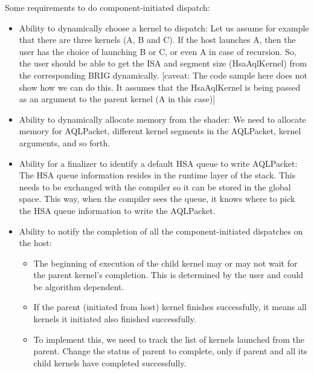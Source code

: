 \documentclass{book}
\begin{document}
\begin{appendices}
Some requirements to do component-\/initiated dispatch\-:

\begin{itemize}

\item Ability to dynamically choose a kernel to dispatch\-: Let us
assume for example that there are three kernels (A, B and C). If the
host launches A, then the user has the choice of launching B or C,
or even A in case of recursion. So, the user should be able to get
the I\-S\-A and segment size (Hsa\-Aql\-Kernel) from the
corresponding B\-R\-I\-G dynamically. \mbox{[}caveat\-: The code
sample here does not show how we can do this. It assumes that the
Hsa\-Aql\-Kernel is being passed as an argument to the parent kernel
(A in this case)\mbox{]}

\item Ability to dynamically allocate memory from the shader\-: We
need to allocate memory for A\-Q\-L\-Packet, different kernel
segments in the A\-Q\-L\-Packet, kernel arguments, and so forth.

\item Ability for a finalizer to identify a default H\-S\-A queue to
write A\-Q\-L\-Packet\-: The H\-S\-A queue information resides in
the runtime layer of the stack. This needs to be exchanged with the
compiler so it can be stored in the global space. This way, when the
compiler sees the queue, it knows where to pick the H\-S\-A queue
information to write the A\-Q\-L\-Packet.

\item Ability to notify the completion of all the
component-\/initiated dispatches on the host\-:

\begin{itemize}
\item The beginning of execution of the child kernel may or may not
wait for the parent kernel's completion. This is determined by the
user and could be algorithm dependent.
\item If the parent (initiated from host) kernel finishes
successfully, it means all kernels it initiated also finished
successfully.
\item To implement this, we need to track the list of kernels
launched from the parent. Change the status of parent to complete,
only if parent and all its child kernels have completed
successfully.
\end{itemize}
\end{itemize}


\end{appendices}
\end{document}
